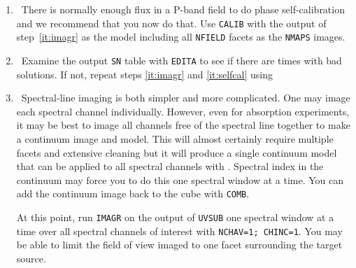 \begin{enumerate}
\item\ There is normally enough flux in a P-band field to do
  phase self-calibration and we recommend that you now do that.  Use
  {\tt CALIB} with the output of step~\ref{it:imagr} as the model
  including all {\tt NFIELD} facets as the {\tt NMAPS} images.
  \label{it:selfcal}

\item\ Examine the output {\tt SN} table with {\tt EDITA} to see if
  there are times with bad solutions.  If not, repeat steps
  \ref{it:imagr} and \ref{it:selfcal} using

\vfill\eject
\item\ Spectral-line imaging is both simpler and more complicated.
  One may image each spectral channel individually.  However, even for
  absorption experiments, it may be best to image all channels free of
  the spectral line together to make a continuum image and model.
  This will almost certainly require multiple facets and extensive
  cleaning but it will produce a single continuum model that can be
  applied to all spectral channels with {\tt {}}\@.
  Spectral index in the continuum may force you to do this one
  spectral window at a time.  You can add the continuum image back to
  the cube with {\tt COMB}\@.

  At this point, run {\tt IMAGR} on the output of {\tt UVSUB} one
  spectral window at a time over all spectral channels of interest
  with {\tt NCHAV=1; CHINC=1}\@.  You may be able to limit the field
  of view imaged to one facet surrounding the target source.


\end{enumerate}

